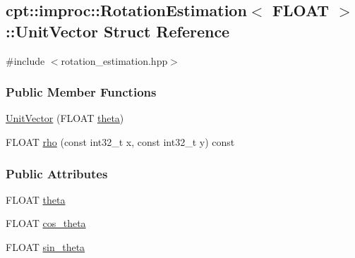 \hypertarget{structcpt_1_1improc_1_1_rotation_estimation_1_1_unit_vector}{\subsection{cpt\-:\-:improc\-:\-:Rotation\-Estimation$<$ F\-L\-O\-A\-T $>$\-:\-:Unit\-Vector Struct Reference}
\label{structcpt_1_1improc_1_1_rotation_estimation_1_1_unit_vector}
}


{\ttfamily \#include $<$rotation\-\_\-estimation.\-hpp$>$}

\subsubsection*{Public Member Functions}
\begin{DoxyCompactItemize}
\item 
\hyperlink{structcpt_1_1improc_1_1_rotation_estimation_1_1_unit_vector_ac52948eec48bc48f4f7293102c7025a7}{Unit\-Vector} (F\-L\-O\-A\-T \hyperlink{structcpt_1_1improc_1_1_rotation_estimation_1_1_unit_vector_aab5114d631110a4bc0bafedea2a005cf}{theta})
\item 
F\-L\-O\-A\-T \hyperlink{structcpt_1_1improc_1_1_rotation_estimation_1_1_unit_vector_abc5ef6e80c00cbe516b06a6e2dccd9fe}{rho} (const int32\-\_\-t x, const int32\-\_\-t y) const 
\end{DoxyCompactItemize}
\subsubsection*{Public Attributes}
\begin{DoxyCompactItemize}
\item 
F\-L\-O\-A\-T \hyperlink{structcpt_1_1improc_1_1_rotation_estimation_1_1_unit_vector_aab5114d631110a4bc0bafedea2a005cf}{theta}
\item 
F\-L\-O\-A\-T \hyperlink{structcpt_1_1improc_1_1_rotation_estimation_1_1_unit_vector_a25c517207e9424fd78d8790ce73eb841}{cos\-\_\-theta}
\item 
F\-L\-O\-A\-T \hyperlink{structcpt_1_1improc_1_1_rotation_estimation_1_1_unit_vector_a1e37e8c6a56ac786337bf22a37dbee6a}{sin\-\_\-theta}
\end{DoxyCompactItemize}



